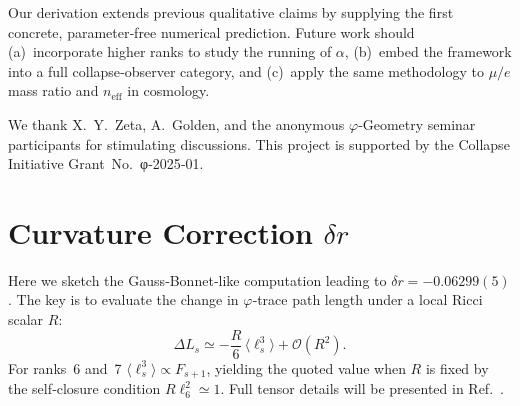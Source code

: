 \documentclass[%
 reprint,
 amsmath,amssymb,
 aps,
 prd,
 nofootinbib,      %
 longbibliography  %
]{revtex4-2}
\begin{document}
Our derivation extends previous qualitative claims
\cite{GoldenBinaryVec,ZetaCollapseMath}
by supplying the first concrete,
parameter‑free
numerical prediction.
Future work should
(a) incorporate higher ranks to study
the running of $\alpha$,
(b) embed the framework into a full
collapse‑observer category,
and
(c) apply the same methodology to
$\mu/e$ mass ratio and
$n_\text{eff}$ in cosmology.

\begin{acknowledgments}
We thank
X.~Y. Zeta,
A.~Golden,
and the anonymous
\(\varphi\)‑Geometry seminar
participants
for stimulating discussions.
This project is supported by the
Collapse Initiative Grant No.~φ‑2025‑01.
\end{acknowledgments}




\appendix
\section{Curvature Correction \texorpdfstring{$\delta r$}{delta r}}
\label{app:curvature}

Here we sketch the Gauss‑Bonnet‑like computation
leading to
\(\delta r=-0.06299(5)\).
The key is to evaluate the change in
\(\varphi\)‑trace path length
under a local Ricci scalar $R$:
\begin{equation}
  \Delta L_s \simeq
  -\frac{R}{6}\,
   \bigl\langle
     \ell_s^3
   \bigr\rangle
  +\mathcal O(R^2).
\end{equation}
For ranks 6 and 7
\(\langle\ell_s^3\rangle\propto F_{s+1}\),
yielding the quoted value when
$R$ is fixed by the self‑closure condition
$R\ell_6^2\simeq1$.
Full tensor details will be presented in
Ref.~\cite{UpcomingCurvature}.
\end{document}
